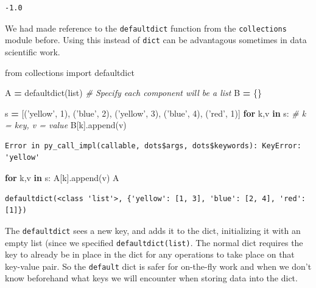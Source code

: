\documentclass[
  letterpaper,
]{scrbook}
\newenvironment{Shaded}{\begin{snugshade}}{\end{snugshade}}
\newcommand{\BuiltInTok}[1]{#1}
\newcommand{\CommentTok}[1]{\textcolor[rgb]{0.56,0.35,0.01}{\textit{#1}}}
\newcommand{\ControlFlowTok}[1]{\textcolor[rgb]{0.13,0.29,0.53}{\textbf{#1}}}
\newcommand{\DecValTok}[1]{\textcolor[rgb]{0.00,0.00,0.81}{#1}}
\newcommand{\ImportTok}[1]{#1}
\newcommand{\KeywordTok}[1]{\textcolor[rgb]{0.13,0.29,0.53}{\textbf{#1}}}
\newcommand{\NormalTok}[1]{#1}
\newcommand{\OperatorTok}[1]{\textcolor[rgb]{0.81,0.36,0.00}{\textbf{#1}}}
\newcommand{\StringTok}[1]{\textcolor[rgb]{0.31,0.60,0.02}{#1}}
\begin{document}
\begin{verbatim}
-1.0
\end{verbatim}

We had made reference to the \texttt{defaultdict} function from the \texttt{collections} module before. Using this instead of \texttt{dict} can be advantagous sometimes in data scientific work.

\begin{Shaded}
\begin{Highlighting}[]
\ImportTok{from}\NormalTok{ collections }\ImportTok{import}\NormalTok{ defaultdict}

\NormalTok{A }\OperatorTok{=}\NormalTok{ defaultdict(}\BuiltInTok{list}\NormalTok{) }\CommentTok{# Specify each component will be a list}
\NormalTok{B }\OperatorTok{=}\NormalTok{ \{\}}

\NormalTok{s }\OperatorTok{=}\NormalTok{ [(}\StringTok{'yellow'}\NormalTok{, }\DecValTok{1}\NormalTok{), (}\StringTok{'blue'}\NormalTok{, }\DecValTok{2}\NormalTok{), (}\StringTok{'yellow'}\NormalTok{, }\DecValTok{3}\NormalTok{), (}\StringTok{'blue'}\NormalTok{, }\DecValTok{4}\NormalTok{), (}\StringTok{'red'}\NormalTok{, }\DecValTok{1}\NormalTok{)]}
\ControlFlowTok{for}\NormalTok{ k,v }\KeywordTok{in}\NormalTok{ s: }\CommentTok{# k = key, v = value}
\NormalTok{    B[k].append(v)}
\end{Highlighting}
\end{Shaded}

\begin{verbatim}
Error in py_call_impl(callable, dots$args, dots$keywords): KeyError: 'yellow'
\end{verbatim}

\begin{Shaded}
\begin{Highlighting}[]
\ControlFlowTok{for}\NormalTok{ k,v }\KeywordTok{in}\NormalTok{ s:}
\NormalTok{    A[k].append(v)}
\NormalTok{A}
\end{Highlighting}
\end{Shaded}

\begin{verbatim}
defaultdict(<class 'list'>, {'yellow': [1, 3], 'blue': [2, 4], 'red': [1]})
\end{verbatim}

The \texttt{defaultdict} sees a new key, and adds it to the dict, initializing it with an empty list (since we specified \texttt{defaultdict(list)}. The normal dict requires the key to already be in place in the dict for any operations to take place on that key-value pair. So the \texttt{default} dict is safer for on-the-fly work and when we don't know beforehand what keys we will encounter when storing data into the dict.
\end{document}
